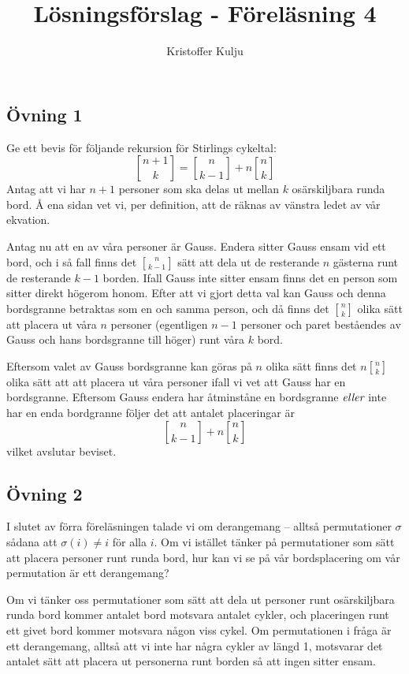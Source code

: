 \documentclass{article}
\title{Lösningsförslag - Föreläsning 4}
\author{Kristoffer Kulju}
\begin{document}
\maketitle

\subsection*{Övning 1}
Ge ett bevis för följande rekursion för Stirlings cykeltal:
$$
{n + 1 \brack k} = {n \brack k - 1} + n{n \brack k}
$$
Antag att vi har $n+1$ personer som ska delas ut mellan $k$ osärskiljbara runda bord. Å ena sidan vet vi, per definition, att de räknas av vänstra ledet av vår ekvation. 

Antag nu att en av våra personer är Gauss. Endera sitter Gauss ensam vid ett bord, och i så fall finns det ${n \brack k - 1}$ sätt att dela ut de resterande $n$ gästerna runt de resterande $k-1$ borden. Ifall Gauss inte sitter ensam finns det en person som sitter direkt högerom honom. Efter att vi gjort detta val kan Gauss och denna bordsgranne betraktas som en och samma person, och då finns det ${n \brack k}$ olika sätt att placera ut våra $n$ personer (egentligen $n - 1$ personer och paret beståendes av Gauss och hans bordsgranne till höger) runt våra $k$ bord. 

Eftersom valet av Gauss bordsgranne kan göras på $n$ olika sätt finns det $n{n \brack k}$ olika sätt att att placera ut våra personer ifall vi vet att Gauss har en bordsgranne. Eftersom Gauss endera har åtminståne en bordsgranne $\emph{eller}$ inte har en enda bordgranne följer det att antalet placeringar är $$
{n \brack k - 1} + n{n \brack k}
$$ vilket avslutar beviset.
 
\subsection*{Övning 2}
I slutet av förra föreläsningen talade vi om derangemang – alltså permutationer $\sigma$ sådana att $\sigma(i)\neq i$ för alla $i$. Om vi istället tänker på permutationer som sätt att placera personer runt runda bord, hur kan vi se på vår bordsplacering om vår permutation är ett derangemang?

Om vi tänker oss permutationer som sätt att dela ut personer runt osärskiljbara runda bord kommer antalet bord motsvara antalet cykler, och placeringen runt ett givet bord kommer motsvara någon viss cykel. Om permutationen i fråga är ett derangemang, alltså att vi inte har några cykler av längd 1, motsvarar det antalet sätt att placera ut personerna runt borden så att ingen sitter ensam.
\end{document}
